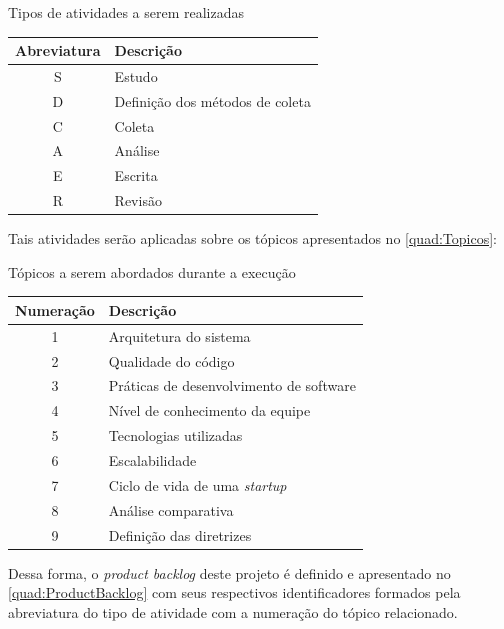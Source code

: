 \begin{quadro}
    \caption{Tipos de atividades a serem realizadas\label{quad:TiposDeAtividade}}
    \begin{tabular}{ | c | l | }
    \hline
    \textbf{Abreviatura} &
        \textbf{Descrição} \\ \hline
        S & Estudo \\ \hline
        D & Definição dos métodos de coleta \\ \hline
        C & Coleta \\ \hline
        A & Análise \\ \hline
        E & Escrita \\ \hline
        R & Revisão \\ \hline
    \end{tabular}
\end{quadro}

Tais atividades serão aplicadas sobre os tópicos apresentados no \autoref{quad:Topicos}:

\begin{quadro}
    \caption{Tópicos a serem abordados durante a execução\label{quad:Topicos}}
    \begin{tabular}{ | c | l | }
    \hline
    \textbf{Numeração} &
        \textbf{Descrição} \\ \hline
        1 & Arquitetura do sistema \\ \hline
        2 & Qualidade do código \\ \hline
        3 & Práticas de desenvolvimento de software \\ \hline
        4 & Nível de conhecimento da equipe \\ \hline
        5 & Tecnologias utilizadas \\ \hline
        6 & Escalabilidade \\ \hline
        7 & Ciclo de vida de uma \textit{startup} \\ \hline
        8 & Análise comparativa \\ \hline
        9 & Definição das diretrizes \\ \hline
    \end{tabular}
\end{quadro}

Dessa forma, o \textit{product backlog} deste projeto é definido e apresentado
no \autoref{quad:ProductBacklog} com seus respectivos identificadores formados
pela abreviatura do tipo de atividade com a numeração do tópico relacionado.

